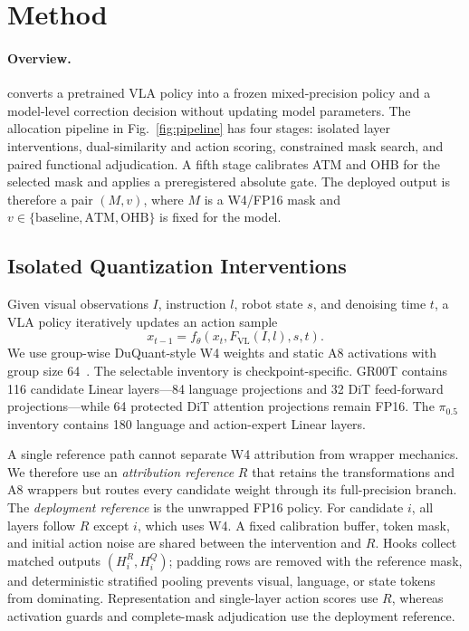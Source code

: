 \section{Method}
\label{sec:method}

\paragraph{Overview.}
\method converts a pretrained VLA policy into a frozen mixed-precision policy and a model-level correction decision without updating model parameters. The allocation pipeline in Fig.~\ref{fig:pipeline} has four stages: isolated layer interventions, dual-similarity and action scoring, constrained mask search, and paired functional adjudication. A fifth stage calibrates ATM and OHB for the selected mask and applies a preregistered absolute gate. The deployed output is therefore a pair $(M,v)$, where $M$ is a W4/FP16 mask and $v\in\{\text{baseline},\text{ATM},\text{OHB}\}$ is fixed for the model.



\subsection{Isolated Quantization Interventions}
\label{sec:setting}

Given visual observations $I$, instruction $l$, robot state $s$, and denoising time $t$, a VLA policy iteratively updates an action sample
\begin{equation}
    x_{t-1}=f_{\theta}(x_t,F_{\mathrm{VL}}(I,l),s,t).
    \label{eq:vla}
\end{equation}
We use group-wise DuQuant-style W4 weights and static A8 activations with group size 64~\cite{lin2024duquant}. The selectable inventory is checkpoint-specific. GR00T contains 116 candidate Linear layers---84 language projections and 32 DiT feed-forward projections---while 64 protected DiT attention projections remain FP16. The $\pi_{0.5}$ inventory contains 180 language and action-expert Linear layers.

A single reference path cannot separate W4 attribution from wrapper mechanics. We therefore use an \emph{attribution reference} $R$ that retains the transformations and A8 wrappers but routes every candidate weight through its full-precision branch. The \emph{deployment reference} is the unwrapped FP16 policy. For candidate $i$, all layers follow $R$ except $i$, which uses W4. A fixed calibration buffer, token mask, and initial action noise are shared between the intervention and $R$. Hooks collect matched outputs $(H_i^R,H_i^Q)$; padding rows are removed with the reference mask, and deterministic stratified pooling prevents visual, language, or state tokens from dominating. Representation and single-layer action scores use $R$, whereas activation guards and complete-mask adjudication use the deployment reference.

